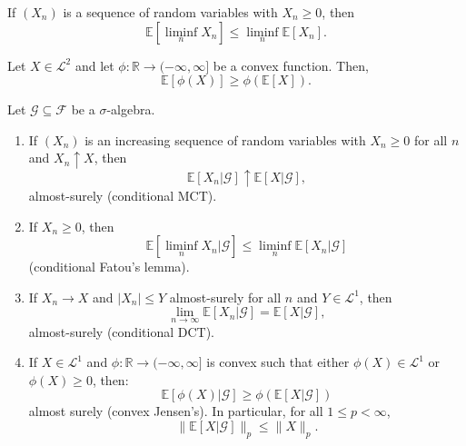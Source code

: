 \documentclass[12pt]{article}
\begin{document}
\begin{theorem}
	If $(X_n)$ is a sequence of random variables with $X_n \geq 0$, then
	\[
	\mathbb{E}[\liminf_n X_n] \leq \liminf_n \mathbb{E}[X_n].
	\]
\end{theorem}

\begin{theorem}
	Let $X \in \mathcal{L}^2$ and let $\phi : \mathbb{R} \to (-\infty, \infty]$ be a convex function. Then,
	\[
	\mathbb{E}[\phi(X)] \geq \phi(\mathbb{E}[X]).
	\]
\end{theorem}

\begin{proposition}
	Let $\mathcal{G} \subseteq \mathcal{F}$ be a $\sigma$-algebra.
	\begin{enumerate}[\normalfont1.]
		\item If $(X_n)$ is an increasing sequence of random variables with $X_n \geq 0$ for all $n$ and $X_n \uparrow X$, then
			\[
			\mathbb{E}[X_n | \mathcal{G}] \uparrow \mathbb{E}[X |\mathcal{G}],
			\]
			almost-surely (conditional MCT).
		\item If $X_n \geq 0$, then
			\[
			\mathbb{E}[\liminf_n X_n | \mathcal{G}] \leq \liminf_n \mathbb{E}[X_n | \mathcal{G}]
			\]
			(conditional Fatou's lemma).
		\item If $X_n \to X$ and $|X_n| \leq Y$ almost-surely for all $n$ and $Y \in \mathcal{L}^1$, then
			\[
			\lim_{n \to \infty} \mathbb{E}[X_n | \mathcal{G}] = \mathbb{E}[X | \mathcal{G}],
			\]
			almost-surely (conditional DCT).
		\item If $X \in \mathcal{L^1}$ and $\phi : \mathbb{R} \to (-\infty, \infty]$ is convex such that either $\phi(X) \in \mathcal{L}^1$ or $\phi(X) \geq 0$, then:
			\[
			\mathbb{E}[\phi(X) | \mathcal{G}] \geq \phi(\mathbb{E}[X | \mathcal{G}])
			\]
			almost surely (convex Jensen's). In particular, for all $1 \leq p < \infty$,
			\[
			\|\mathbb{E}[X|\mathcal{G}]\|_p \leq \|X\|_p.
			\]
	\end{enumerate}
\end{proposition}
\end{document}
